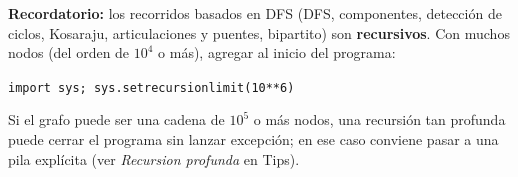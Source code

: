 \textbf{Recordatorio:} los recorridos basados en DFS (DFS, componentes, detección de ciclos, Kosaraju, articulaciones y puentes, bipartito) son \textbf{recursivos}. Con muchos nodos (del orden de \(10^4\) o más), agregar al inicio del programa:
\begin{center}
\texttt{import sys; sys.setrecursionlimit(10**6)}
\end{center}
Si el grafo puede ser una cadena de \(10^5\) o más nodos, una recursión tan profunda puede cerrar el programa sin lanzar excepción; en ese caso conviene pasar a una pila explícita (ver \textit{Recursion profunda} en Tips).
